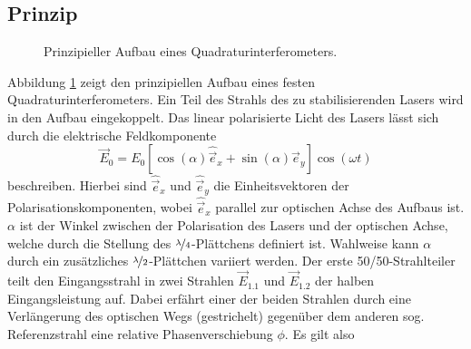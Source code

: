 \subsection{Prinzip}\label{subsec:quadraturinterferometer_prinzip}
\begin{figure}[h]
 	\centering
	\caption[Quadraturinterferometer - prinzipieller Aufbau]{Prinzipieller Aufbau
	eines Quadraturinterferometers.}
	\label{fig:quadraturinterferometer_aufbau}
\end{figure}
Abbildung \ref{fig:quadraturinterferometer_aufbau} zeigt den prinzipiellen
Aufbau eines festen Quadraturinterferometers. Ein Teil des Strahls des zu stabilisierenden
Lasers wird in den Aufbau eingekoppelt. Das linear polarisierte
Licht des Lasers lässt sich durch die elektrische Feldkomponente
\begin{equation}\label{eq:quadraturinterfferometer_01}
	\vec{E}_0=E_0\left[\cos{(\alpha)}\hat{\vec{e}}_x+\sin{(\alpha)}\hat{\vec{e}}_y\right]\cos{(\omega
	t)}
\end{equation}
beschreiben. Hierbei sind $\hat{\vec{e}}_x$ und $\hat{\vec{e}}_y$ die
Einheitsvektoren der Polarisationskomponenten, wobei $\hat{\vec{e}}_x$ parallel
zur optischen Achse des Aufbaus ist. $\alpha$ ist der Winkel zwischen der
Polarisation des Lasers und der optischen Achse, welche durch die Stellung des
$\nicefrac{\lambda}{4}$-Plättchens definiert ist. Wahlweise kann $\alpha$ durch
ein zusätzliches $\nicefrac{\lambda}{2}$-Plättchen variiert werden.
Der erste 50/50-Strahlteiler teilt den Eingangsstrahl in zwei Strahlen
$\vec{E}_{1.1}$ und $\vec{E}_{1.2}$ der halben Eingangsleistung auf. Dabei erfährt einer der
beiden Strahlen durch eine Verlängerung des optischen Wegs (gestrichelt)
gegenüber dem anderen sog.
Referenzstrahl eine relative Phasenverschiebung $\phi$. Es gilt also
